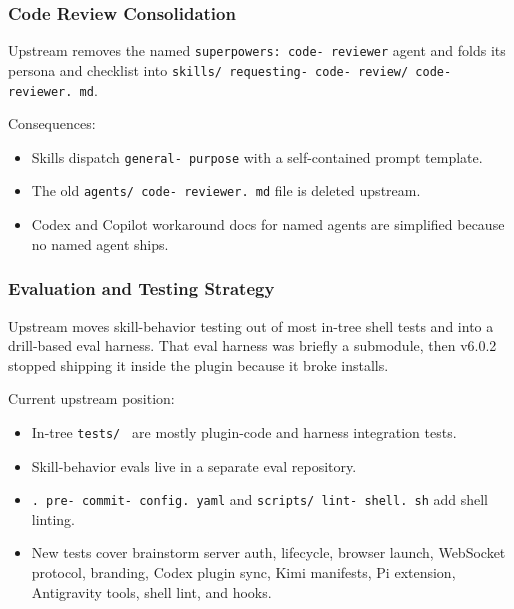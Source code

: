 \documentclass[twocolumn,10pt,letterpaper]{article}
\begin{document}
\subsubsection{Code Review Consolidation}

Upstream removes the named \texttt{superpowers: code- reviewer} agent and folds its persona and checklist into \texttt{skills/ requesting- code- review/ code- reviewer. md}.


Consequences:


\begin{itemize}
\setlength{\itemsep}{0pt}
\setlength{\parskip}{0pt}
  \item Skills dispatch \texttt{general- purpose} with a self-contained prompt template.
  \item The old \texttt{agents/ code- reviewer. md} file is deleted upstream.
  \item Codex and Copilot workaround docs for named agents are simplified because no named agent ships.
\end{itemize}

\subsubsection{Evaluation and Testing Strategy}

Upstream moves skill-behavior testing out of most in-tree shell tests and into a drill-based eval harness. That eval harness was briefly a submodule, then v6.0.2 stopped shipping it inside the plugin because it broke installs.


Current upstream position:


\begin{itemize}
\setlength{\itemsep}{0pt}
\setlength{\parskip}{0pt}
  \item In-tree \texttt{tests/ } are mostly plugin-code and harness integration tests.
  \item Skill-behavior evals live in a separate eval repository.
  \item \texttt{. pre- commit- config. yaml} and \texttt{scripts/ lint- shell. sh} add shell linting.
  \item New tests cover brainstorm server auth, lifecycle, browser launch, WebSocket protocol, branding, Codex plugin sync, Kimi manifests, Pi extension, Antigravity tools, shell lint, and hooks.
\end{itemize}
\end{document}
